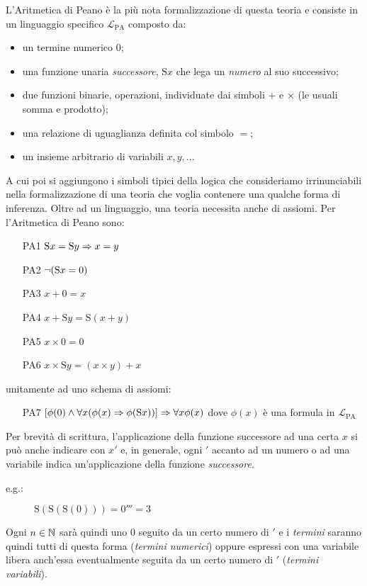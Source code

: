 		L'Aritmetica di Peano è la più nota formalizzazione di questa teoria e consiste in un linguaggio specifico $\mathscr{L}_{\text{PA}}$ composto da:
	\begin{itemize}
		\item un termine numerico $0$;
		\item una funzione unaria \textit{successore}, $\text{S}x$ che lega un \textit{numero} al suo successivo;
		\item due funzioni binarie, operazioni, individuate dai simboli $+$ e $\times$ (le usuali somma e prodotto);
		\item una relazione di uguaglianza definita col simbolo $=$;
		\item un insieme arbitrario di variabili $x, y,\ldots$ 
	\end{itemize}
		A cui poi si aggiungono i simboli tipici della logica che consideriamo irrinunciabili nella formalizzazione di una teoria che voglia contenere una qualche forma di inferenza.
		Oltre ad un linguaggio, una teoria necessita anche di assiomi. Per l'Aritmetica di Peano sono:
		\begin{itemize}
			\item[PA1] \quad $ \text{S}x = \text{S}y \Rightarrow x=y $
			\item[PA2] \quad $\neg (\text{S}x=0)$
			\item[PA3] \quad $x+0=x$
			\item[PA4] \quad $x+\text{S}y=\text{S}(x+y)$
			\item[PA5] \quad $x\times0=0$
			\item[PA6] \quad $x\times \text{S}y=(x\times y)+x$
		\end{itemize}
		unitamente ad uno schema di assiomi:
		\begin{itemize}
			\item[PA7] \quad $[\phi(0) \land \forall x(\phi(x)\Rightarrow \phi(\text{S}x))] \Rightarrow \forall x\phi(x)$ \quad dove $\phi(x)$ è una formula in $\mathscr{L}_{\text{PA}}$
		\end{itemize}
		Per brevità di scrittura, l'applicazione della funzione successore ad una certa $x$ si può anche indicare con $x'$ e, in generale, ogni $'$ accanto ad un numero o ad una variabile indica un'applicazione della funzione \emph{successore}.
	\begin{description}
		\item[e.g.:] \quad $\text{S}(\text{S}(\text{S}(0))) = 0''' = 3$
	\end{description}
		Ogni $n \in \mathbb{N}$ sarà quindi uno $0$ seguito da un certo numero di $'$ e i \emph{termini} saranno quindi tutti di questa forma (\emph{termini numerici}) oppure espressi con una variabile libera  anch'essa eventualmente seguita da un certo numero di $'$  (\emph{termini variabili}).
		
